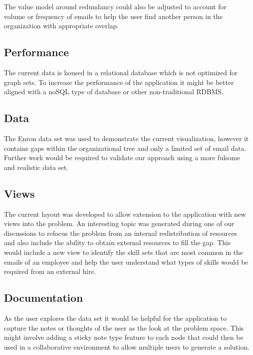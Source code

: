 \documentclass[journal]{vgtc}                %
\begin{document}
The value model around redundancy could also be adjusted to account for volume or frequency of emails to help the user find another person in the organization with appropriate overlap.

\subsection{Performance}

The current data is housed in a relational database which is not optimized for graph sets.  To increase the performance of the application it might be better aligned with a noSQL type of database or other non-traditional RDBMS.

\subsection{Data}

The Enron data set was used to demonstrate the current visualization, however it contains gaps within the organizational tree and only a limited set of email data.  Further work would be required to validate our approach using a more fulsome and realistic data set.

\subsection{Views}

The current layout was developed to allow extension to the application with new views into the problem.  An interesting topic was generated during one of our discussions to refocus the problem from an internal redistribution of resources and also include the ability to obtain external resources to fill the gap.  This would include a new view to identify the skill sets that are most common in the emails of an employee and help the user understand what types of skills would be required from an external hire.

\subsection{Documentation}

As the user explores the data set it would be helpful for the application to capture the notes or thoughts of the user as the look at the problem space.  This might involve adding a sticky note type feature to each node that could then be used in a collaborative environment to allow multiple users to generate a solution\cite{ware2012information}.
\end{document}

